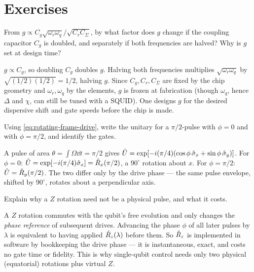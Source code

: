 \section*{Exercises}

\begin{exercise}
From $g\propto C_g\sqrt{\omega_r\omega_q}/\sqrt{C_rC_\Sigma}$, by what
factor does $g$ change if the coupling capacitor $C_g$ is doubled, and
separately if both frequencies are halved? Why is $g$ set at design
time?
\begin{solution}
$g\propto C_g$, so doubling $C_g$ doubles $g$. Halving both
frequencies multiplies $\sqrt{\omega_r\omega_q}$ by $\sqrt{(1/2)(1/2)}=1/2$,
halving $g$. Since $C_g,C_r,C_\Sigma$ are fixed by the chip geometry
and $\omega_r,\omega_q$ by the elements, $g$ is frozen at fabrication
(though $\omega_q$, hence $\Delta$ and $\chi$, can still be tuned with a
SQUID). One designs $g$ for the desired dispersive shift and gate
speeds before the chip is made.
\end{solution}
\end{exercise}

\begin{exercise}
Using \cref{eq:rotating-frame-drive}, write the unitary for a
$\pi/2$-pulse with $\phi=0$ and with $\phi=\pi/2$, and identify the
gates.
\begin{solution}
A pulse of area $\theta=\int\Omega\dd t=\pi/2$ gives
$\hat{U}=\exp[-i(\pi/4)(\cos\phi\,\hat\sigma_x+\sin\phi\,\hat\sigma_y)]$.
For $\phi=0$: $\hat{U}=\exp[-i(\pi/4)\hat\sigma_x]=\hat{R}_x(\pi/2)$, a
$90^\circ$ rotation about $x$. For $\phi=\pi/2$:
$\hat{U}=\hat{R}_y(\pi/2)$. The two differ only by the drive phase --- the
same pulse envelope, shifted by $90^\circ$, rotates about a
perpendicular axis.
\end{solution}
\end{exercise}

\begin{exercise}
Explain why a $Z$ rotation need not be a physical pulse, and what it
costs.
\begin{solution}
A $Z$ rotation commutes with the qubit's free evolution and only
changes the \emph{phase reference} of subsequent drives. Advancing the
phase $\phi$ of all later pulses by $\lambda$ is equivalent to having
applied $\hat{R}_z(\lambda)$ before them. So $\hat{R}_z$ is implemented in
software by bookkeeping the drive phase --- it is instantaneous,
exact, and costs no gate time or fidelity. This is why single-qubit
control needs only two physical (equatorial) rotations plus virtual
$Z$.
\end{solution}
\end{exercise}

